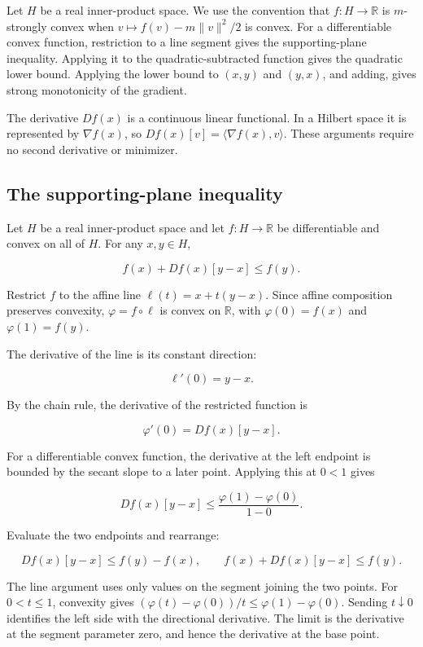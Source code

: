\documentclass[11pt,a4paper]{report}
\begin{document}
Let \(H\) be a real inner-product space. We use the convention that \(f:H\to\mathbb R\) is \(m\)-strongly convex when \(v\mapsto f(v)-m\|v\|^2/2\) is convex. For a differentiable convex function, restriction to a line segment gives the supporting-plane inequality. Applying it to the quadratic-subtracted function gives the quadratic lower bound. Applying the lower bound to \((x,y)\) and \((y,x)\), and adding, gives strong monotonicity of the gradient.



The derivative \(Df(x)\) is a continuous linear functional. In a Hilbert space it is represented by \(\nabla f(x)\), so \(Df(x)[v]=\langle\nabla f(x),v\rangle\). These arguments require no second derivative or minimizer.

\subsection{\texorpdfstring{The supporting-plane inequality}{The supporting-plane inequality}}
\label{report-step-UnadjustedLangevin-StrongConvexity-lean-1}


Let \(H\) be a real inner-product space and let \(f:H\to\mathbb R\) be differentiable and convex on all of \(H\). For any \(x,y\in H\),

\[f(x)+Df(x)[y-x]\le f(y).\]

Restrict \(f\) to the affine line \(\ell(t)=x+t(y-x)\). Since affine composition preserves convexity, \(\varphi=f\circ\ell\) is convex on \(\mathbb R\), with \(\varphi(0)=f(x)\) and \(\varphi(1)=f(y)\).



The derivative of the line is its constant direction:

\[\ell'(0)=y-x.\]

By the chain rule, the derivative of the restricted function is

\[\varphi'(0)=Df(x)[y-x].\]

For a differentiable convex function, the derivative at the left endpoint is bounded by the secant slope to a later point. Applying this at \(0<1\) gives

\[Df(x)[y-x]\le\frac{\varphi(1)-\varphi(0)}{1-0}.\]

Evaluate the two endpoints and rearrange:

\[Df(x)[y-x]\le f(y)-f(x),\qquad f(x)+Df(x)[y-x]\le f(y).\]

The line argument uses only values on the segment joining the two points. For \(0<t\le1\), convexity gives \((\varphi(t)-\varphi(0))/t\le\varphi(1)-\varphi(0)\). Sending \(t\downarrow0\) identifies the left side with the directional derivative. The limit is the derivative at the segment parameter zero, and hence the derivative at the base point.
\end{document}
